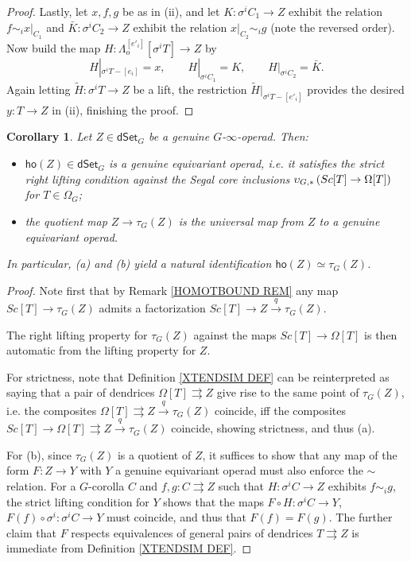 \documentclass[a4paper,10pt]{article}%
\numberwithin{equation}{section}
\numberwithin{figure}{section}
\newtheorem{corollary}[equation]{Corollary}%
\theoremstyle{definition} %
\newcommand{\1}{\ensuremath{\mathbbm 1}}%
\begin{document}
\begin{proof}
Lastly, let $x,f,g$ be as in (ii), 
and let
$K \colon \sigma^i C_1 \to Z$ exhibit the relation
$f \sim_i x|_{C_1}$
and 
$ \bar{K} \colon \sigma^i C_2 \to Z$
exhibit the relation
$x|_{C_2} \sim_i g$ (note the reversed order).
Now build the map
$H \colon \Lambda_o^{[e'_i]}[\sigma^i T] \to Z$ by
\[
	H|_{\sigma^i T - [e_i]} = x,
\qquad
	H|_{\sigma^i C_1} = K,
\qquad
	H|_{\sigma^i C_2} = \bar{K}.
\]
Again letting 
$\widetilde{H} \colon \sigma^i T \to Z$ be a lift,
the restriction 
$\widetilde{H}|_{\sigma^i T - [e'_i]}$
provides the desired $y \colon T \to Z$ in (ii),
finishing the proof.
\end{proof}



\begin{corollary}\label{HOOPUNIV COR}
Let $Z \in \mathsf{dSet}_G$ be a genuine $G$-$\infty$-operad. Then:
	\begin{itemize}
	\item[(a)] $\mathsf{ho}(Z) \in \mathsf{dSet}_G$ is a genuine equivariant operad, i.e. it satisfies the strict right lifting condition against the Segal core inclusions
	$\upsilon_{G,\**}\left(Sc[T] \to \Omega[T]\right)$ for $T \in \Omega_G$;
	\item[(b)] the quotient map
	$Z \to \tau_G(Z)$ is the universal map from $Z$ to a genuine equivariant operad.
	\end{itemize}
In particular, (a) and (b) yield a natural identification
$
\mathsf{ho}(Z)
\simeq
\tau_G(Z)
$.
\end{corollary}




\begin{proof}
	Note first that by Remark \ref{HOMOTBOUND REM}
	any map $Sc[T] \to \tau_G(Z)$ admits a factorization 
	$Sc[T] \to Z \xrightarrow{q} \tau_G(Z)$.
	 
	The right lifting property for $\tau_G(Z)$
	against the maps $Sc[T] \to \Omega[T]$
	is then automatic from the lifting property for $Z$.

	For strictness,	
	note that Definition \ref{XTENDSIM DEF}
	can be reinterpreted as saying that
	a pair of dendrices $\Omega[T] \rightrightarrows Z$
	give rise to the same point of 
	$\tau_G(Z)$, i.e. 
	the composites 
	$\Omega[T] \rightrightarrows Z \xrightarrow{q}
	\tau_G(Z)$ coincide, 
	iff the composites 
	$Sc[T] \to \Omega[T] \rightrightarrows Z \xrightarrow{q}
	\tau_G(Z)$ coincide, showing strictness, and thus (a).
		
	For (b), since $\tau_G(Z)$ is a quotient of
	$Z$, it suffices to show that any map
	of the form $F \colon Z \to Y$ with $Y$ a genuine equivariant operad must also enforce the $\sim$ relation.
	For a $G$-corolla $C$ and
	$f,g\colon C \rightrightarrows Z$ such that 
	$H \colon \sigma^i C \to Z$ exhibits
	$f \sim_i g$, 
	the strict lifting condition for $Y$
	shows that the maps
	$F\circ H \colon \sigma^i C \to Y$,
	$F(f) \circ \sigma^i \colon \sigma^i C \to Y$
	must coincide, and thus that
	$F(f)=F(g)$.
	The further claim that $F$ respects equivalences
	of general pairs of dendrices $T \rightrightarrows Z$
	is immediate from Definition \ref{XTENDSIM DEF}.
\end{proof}
\end{document}
